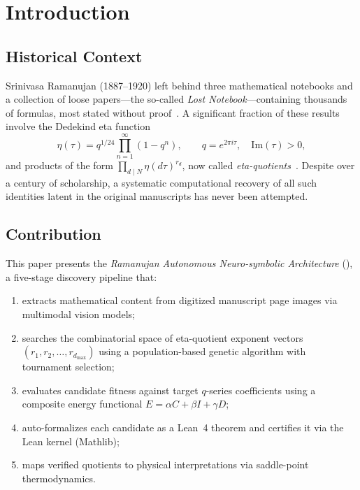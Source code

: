 \section{Introduction}
\label{sec:introduction}

\subsection{Historical Context}

Srinivasa Ramanujan (1887--1920) left behind three mathematical
notebooks and a collection of loose papers---the so-called
\emph{Lost Notebook}---containing thousands of formulas, most
stated without proof~\cite{ramanujan_lost,andrews_berndt_I}.
A significant fraction of these results involve the Dedekind
eta function
\begin{equation}
  \label{eq:dedekind_eta}
  \eta(\tau) = q^{1/24} \prod_{n=1}^{\infty} (1 - q^n),
  \qquad q = e^{2\pi i \tau},\quad \mathrm{Im}(\tau) > 0,
\end{equation}
and products of the form
$\prod_{d \mid N} \eta(d\tau)^{r_d}$, now called
\emph{eta-quotients}~\cite{ono2004,martin_1996}.
Despite over a century of scholarship, a systematic
computational recovery of all such identities latent
in the original manuscripts has never been attempted.

\subsection{Contribution}

This paper presents the \emph{Ramanujan Autonomous
Neuro-symbolic Architecture} (\RAMA{}), a five-stage
discovery pipeline that:
\begin{enumerate}[label=(\roman*)]
  \item extracts mathematical content from digitized
        manuscript page images via multimodal vision models;
  \item searches the combinatorial space of eta-quotient
        exponent vectors $(r_1, r_2, \ldots, r_{d_{\max}})$
        using a population-based genetic algorithm with
        tournament selection;
  \item evaluates candidate fitness against target
        $q$-series coefficients using a composite energy
        functional $E = \alpha C + \beta I + \gamma D$;
  \item auto-formalizes each candidate as a Lean~4 theorem
        and certifies it via the Lean kernel (Mathlib);
  \item maps verified quotients to physical interpretations
        via saddle-point thermodynamics.
\end{enumerate}

